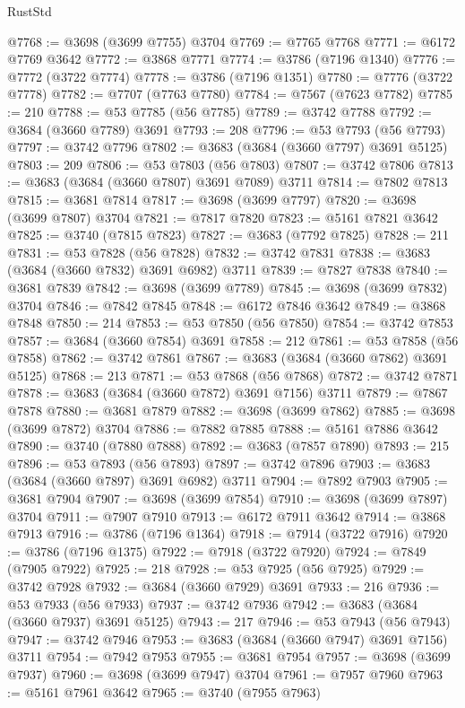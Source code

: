\begin{lexlean}{RustStd}
\begin{coremodule}
@7768 := @3698 (@3699 @7755) @3704
@7769 := @7765 @7768
@7771 := @6172 @7769 @3642
@7772 := @3868 @7771
@7774 := @3786 (@7196 @1340)
@7776 := @7772 (@3722 @7774)
@7778 := @3786 (@7196 @1351)
@7780 := @7776 (@3722 @7778)
@7782 := @7707 (@7763 @7780)
@7784 := @7567 (@7623 @7782)
@7785 := 210
@7788 := @53 @7785 (@56 @7785)
@7789 := @3742 @7788
@7792 := @3684 (@3660 @7789) @3691
@7793 := 208
@7796 := @53 @7793 (@56 @7793)
@7797 := @3742 @7796
@7802 := @3683 (@3684 (@3660 @7797) @3691 @5125)
@7803 := 209
@7806 := @53 @7803 (@56 @7803)
@7807 := @3742 @7806
@7813 := @3683 (@3684 (@3660 @7807) @3691 @7089) @3711
@7814 := @7802 @7813
@7815 := @3681 @7814
@7817 := @3698 (@3699 @7797)
@7820 := @3698 (@3699 @7807) @3704
@7821 := @7817 @7820
@7823 := @5161 @7821 @3642
@7825 := @3740 (@7815 @7823)
@7827 := @3683 (@7792 @7825)
@7828 := 211
@7831 := @53 @7828 (@56 @7828)
@7832 := @3742 @7831
@7838 := @3683 (@3684 (@3660 @7832) @3691 @6982) @3711
@7839 := @7827 @7838
@7840 := @3681 @7839
@7842 := @3698 (@3699 @7789)
@7845 := @3698 (@3699 @7832) @3704
@7846 := @7842 @7845
@7848 := @6172 @7846 @3642
@7849 := @3868 @7848
@7850 := 214
@7853 := @53 @7850 (@56 @7850)
@7854 := @3742 @7853
@7857 := @3684 (@3660 @7854) @3691
@7858 := 212
@7861 := @53 @7858 (@56 @7858)
@7862 := @3742 @7861
@7867 := @3683 (@3684 (@3660 @7862) @3691 @5125)
@7868 := 213
@7871 := @53 @7868 (@56 @7868)
@7872 := @3742 @7871
@7878 := @3683 (@3684 (@3660 @7872) @3691 @7156) @3711
@7879 := @7867 @7878
@7880 := @3681 @7879
@7882 := @3698 (@3699 @7862)
@7885 := @3698 (@3699 @7872) @3704
@7886 := @7882 @7885
@7888 := @5161 @7886 @3642
@7890 := @3740 (@7880 @7888)
@7892 := @3683 (@7857 @7890)
@7893 := 215
@7896 := @53 @7893 (@56 @7893)
@7897 := @3742 @7896
@7903 := @3683 (@3684 (@3660 @7897) @3691 @6982) @3711
@7904 := @7892 @7903
@7905 := @3681 @7904
@7907 := @3698 (@3699 @7854)
@7910 := @3698 (@3699 @7897) @3704
@7911 := @7907 @7910
@7913 := @6172 @7911 @3642
@7914 := @3868 @7913
@7916 := @3786 (@7196 @1364)
@7918 := @7914 (@3722 @7916)
@7920 := @3786 (@7196 @1375)
@7922 := @7918 (@3722 @7920)
@7924 := @7849 (@7905 @7922)
@7925 := 218
@7928 := @53 @7925 (@56 @7925)
@7929 := @3742 @7928
@7932 := @3684 (@3660 @7929) @3691
@7933 := 216
@7936 := @53 @7933 (@56 @7933)
@7937 := @3742 @7936
@7942 := @3683 (@3684 (@3660 @7937) @3691 @5125)
@7943 := 217
@7946 := @53 @7943 (@56 @7943)
@7947 := @3742 @7946
@7953 := @3683 (@3684 (@3660 @7947) @3691 @7156) @3711
@7954 := @7942 @7953
@7955 := @3681 @7954
@7957 := @3698 (@3699 @7937)
@7960 := @3698 (@3699 @7947) @3704
@7961 := @7957 @7960
@7963 := @5161 @7961 @3642
@7965 := @3740 (@7955 @7963)

\end{coremodule}
\end{lexlean}
